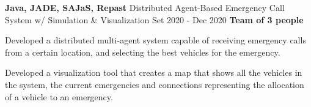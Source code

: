 \cventry
  {\textbf{Java, JADE, SAJaS, Repast}}
  {Distributed Agent-Based Emergency Call System w/ Simulation \& Visualization \href{https://github.com/EduRibeiro00/EmergencyCallSystem-feup-aiad}{\faExternalLink}} %
  {Set 2020 - Dec 2020}
  {\textbf{Team of 3 people}}
  {
    \begin{cvitems} %
      \item {Developed a distributed multi-agent system capable of receiving emergency calls from a certain location, and selecting the best vehicles for the emergency.}
      \item {Developed a visualization tool that creates a map that shows all the vehicles in the system, the current emergencies and connections representing the allocation of a vehicle to an emergency.}
    \end{cvitems}
  }